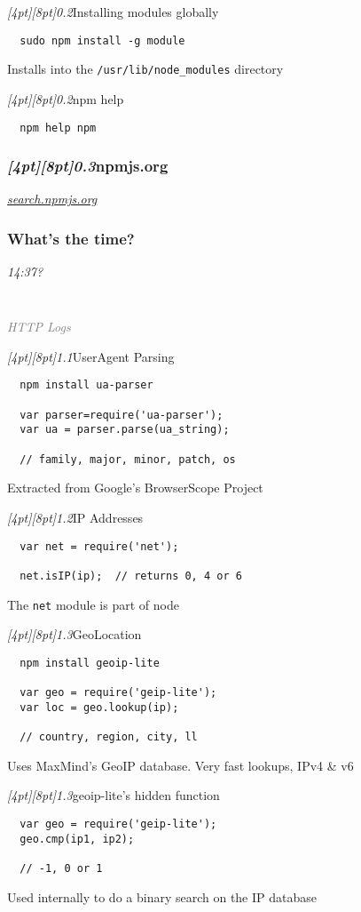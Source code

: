 \documentclass{beamer}
\newcommand{\sn}[1]{\textrm{\textit{\Huge{\raisebox{-3pt}[4pt][8pt]{\textcolor{f2elblue}{#1}}}}}\hspace{4pt}}
\newcommand{\innersplash}[1]{
  \begin{center}
    \large \textrm{\textit{ #1 } }
  \end{center}
}
\newcommand{\splashslide}[2][{}]{
  \begin{frame}
  \frametitle{#1}
  \innersplash{#2}
  \end{frame}
}
\newcommand{\leadinslide}[2]{
  \splashslide{
     {\fontsize{150}{20}\selectfont{\raisebox{0pt}[90pt][0pt]{\textcolor{light-gray}{#1}}}} \\ \huge \textcolor{gray}{#2}
  }
}
\begin{document}
\begin{frame}[fragile]{\sn{0.2}Installing modules globally}
\begin{verbatim}
  sudo npm install -g module
\end{verbatim}
Installs into the \texttt{/usr/lib/node\_modules} directory
\end{frame}

\begin{frame}[fragile]{\sn{0.2}npm help}
\begin{verbatim}
  npm help npm
\end{verbatim}
\end{frame}

\splashslide[\sn{0.3}npmjs.org]{\LARGE \href{http://search.npmjs.org/}{search.npmjs.org}}

\splashslide[What's the time?]{\LARGE 14:37?}

\leadinslide{1}{HTTP Logs}
\begin{frame}[fragile]{\sn{1.1}UserAgent Parsing}
\begin{verbatim}
  npm install ua-parser

  var parser=require('ua-parser');
  var ua = parser.parse(ua_string);

  // family, major, minor, patch, os
\end{verbatim}
Extracted from Google's BrowserScope Project
\end{frame}

\begin{frame}[fragile]{\sn{1.2}IP Addresses}
\begin{verbatim}
  var net = require('net');

  net.isIP(ip);  // returns 0, 4 or 6
\end{verbatim}
The \texttt{net} module is part of node
\end{frame}

\begin{frame}[fragile]{\sn{1.3}GeoLocation}
\begin{verbatim}
  npm install geoip-lite

  var geo = require('geip-lite');
  var loc = geo.lookup(ip);

  // country, region, city, ll
\end{verbatim}
Uses MaxMind's GeoIP database.  Very fast lookups, IPv4 \& v6
\end{frame}

\begin{frame}[fragile]{\sn{1.3}geoip-lite's hidden function}
\begin{verbatim}
  var geo = require('geip-lite');
  geo.cmp(ip1, ip2);

  // -1, 0 or 1
\end{verbatim}
Used internally to do a binary search on the IP database
\end{frame}
\end{document}
